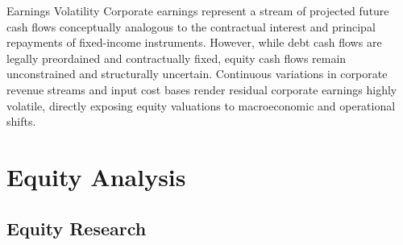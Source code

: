 \documentclass[10pt]{article}
\begin{document}
    \begin{core}{Earnings Volatility}
      Corporate earnings represent a stream of projected future cash flows conceptually analogous to the contractual interest and principal repayments of fixed-income instruments. However, while debt cash flows are legally preordained and contractually fixed, equity cash flows remain unconstrained and structurally uncertain. Continuous variations in corporate revenue streams and input cost bases render residual corporate earnings highly volatile, directly exposing equity valuations to macroeconomic and operational shifts.
    \end{core}

\section{Equity Analysis}

  \subsection{Equity Research}
\end{document}
